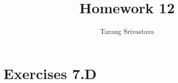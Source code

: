 \documentclass[10pt, twocolumn]{article}
\title{Homework 12}
\author{Tarang Srivastava}
\begin{document}
\makechaptertitle

\section{Exercises 7.D}
\end{document}
